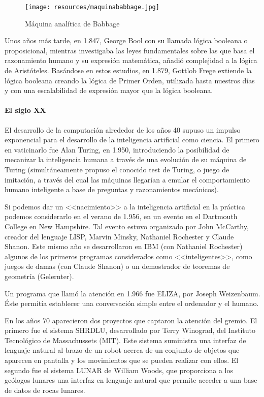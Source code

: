 \documentclass[a4paper, 11pt, titlepage]{article}
\begin{document}
    \begin{figure}[htp]
        \centering
        \texttt{[image: resources/maquinababbage.jpg]}
        \caption{Máquina analítica de Babbage}
        \label{maquinabaggage}
    \end{figure}

    Unos años más tarde, en 1.847, George Bool con su llamada lógica booleana o proposicional, mientras 
    investigaba las leyes fundamentales sobre las que basa el razonamiento humano y su expresión matemática, 
    añadió complejidad a la lógica de Aristóteles. Basándose en estos estudios, en 1.879, Gottlob Frege extiende 
    la lógica booleana creando la lógica de Primer Orden, utilizada hasta nuestros días y con una escalabilidad 
    de expresión mayor que la lógica booleana.

    \paragraph{El siglo XX} El desarrollo de la computación alrededor de los años 40 supuso un impulso exponencial 
    para el desarrollo de la inteligencia artificial como ciencia. El primero en vaticinarlo fue Alan Turing, en
    1.950, introduciendo la posibilidad de mecanizar la inteligencia humana a través de una evolución de su máquina 
    de Turing (simultáneamente propuso el conocido test de Turing, o juego de imitación, a través del cual las 
    máquinas llegarían a emular el comportamiento humano inteligente a base de preguntas y razonamientos mecánicos).

    Si podemos dar un <<nacimiento>> a la inteligencia artificial en la práctica podemos considerarlo en el verano 
    de 1.956, en un evento en el Dartmouth College en New Hampshire. Tal evento estuvo organizado por John McCarthy, 
    creador del lenguaje LISP, Marvin Minsky, Nathaniel Rochester y Claude Shanon. Este mismo año se desarrollaron en 
    IBM (con Nathaniel Rochester) algunos de los primeros programas considerados como <<inteligentes>>, como juegos 
    de damas (con Claude Shanon) o un demostrador de teoremas de geometría (Gelernter).

    Un programa que llamó la atención en 1.966 fue ELIZA, por Joseph Weizenbaum. Éste permitía establecer una 
    conversación simple entre el ordenador y el humano.

    En los años 70 aparecieron dos proyectos que captaron la atención del gremio. El primero fue el sistema SHRDLU, 
    desarrollado por Terry Winograd, del Instituto Tecnológico de Massachussets (MIT). Este sistema suministra 
    una interfaz de lenguaje natural al brazo de un robot acerca de un conjunto de objetos que aparecen en pantalla y 
    los movimientos que se pueden realizar con ellos. El segundo fue el sistema LUNAR de William Woods, que proporciona 
    a los geólogos lunares una interfaz en lenguaje natural que permite acceder a una base de datos de rocas lunares. 
\end{document}
